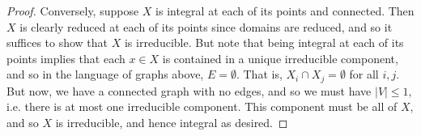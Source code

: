 \begin{proof}
	Conversely, suppose $X$ is integral at each of its points and connected. Then $X$ is clearly reduced at each of its points since domains are reduced, and so it suffices to show that $X$ is irreducible. But note that being integral at each of its points implies that each $x \in X$ is contained in a unique irreducible component, and so in the language of graphs above, $E = \emptyset$. That is, $X_i \cap X_j = \emptyset$ for all $i,j$. But now, we have a connected graph with no edges, and so we must have $|V| \leq 1$, i.e. there is at most one irreducible component. This component must be all of $X$, and so $X$ is irreducible, and hence integral as desired.
\end{proof}

